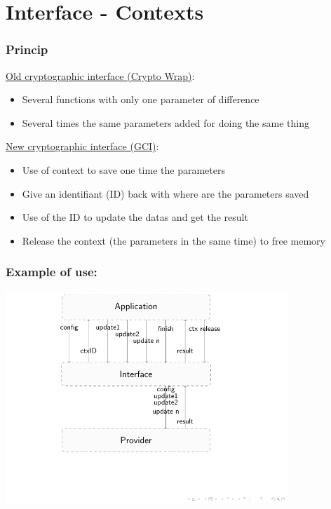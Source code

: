 \section{Interface - Contexts}

\begin{frame}

\frametitle{Princip}

\underline{Old cryptographic interface (Crypto Wrap)}:
\begin{itemize}
  \item Several functions with only one parameter of difference
  \item Several times the same parameters added for doing the same thing
\end{itemize}

\vspace{0.25cm}

\underline{New cryptographic interface (GCI)}:
\begin{itemize}
  \item Use of context to save one time the parameters
  \item Give an identifiant (ID) back with where are the parameters saved
  \item Use of the ID to update the datas and get the result
  \item Release the context (the parameters in the same time) to free memory
\end{itemize}

\end{frame}


\begin{frame}

\frametitle{Example of use:}


\includegraphics[trim=0.5cm 1cm 14cm 0cm, height=8cm]{figures/context.pdf}


\end{frame}
